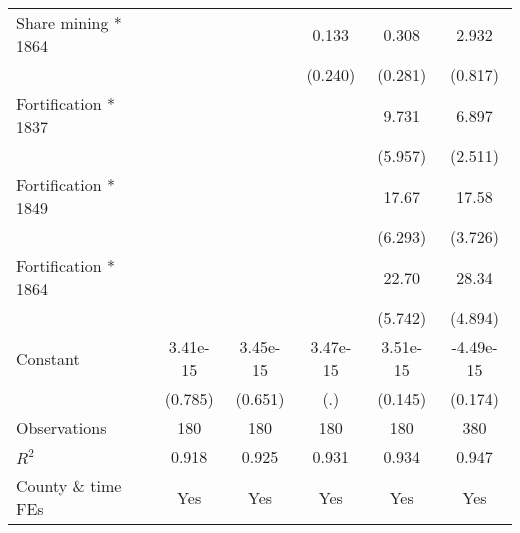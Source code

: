 {\begin{tabular}{l*{5}{c}}
Share mining * 1864 &                     &                     &       0.133         &       0.308         &       2.932\sym{***}\\
                    &                     &                     &     (0.240)         &     (0.281)         &     (0.817)         \\
Fortification * 1837&                     &                     &                     &       9.731         &       6.897\sym{***}\\
                    &                     &                     &                     &     (5.957)         &     (2.511)         \\
Fortification * 1849&                     &                     &                     &       17.67\sym{***}&       17.58\sym{***}\\
                    &                     &                     &                     &     (6.293)         &     (3.726)         \\
Fortification * 1864&                     &                     &                     &       22.70\sym{***}&       28.34\sym{***}\\
                    &                     &                     &                     &     (5.742)         &     (4.894)         \\
Constant            &    3.41e-15         &    3.45e-15         &    3.47e-15         &    3.51e-15         &   -4.49e-15         \\
                    &     (0.785)         &     (0.651)         &         (.)         &     (0.145)         &     (0.174)         \\
\hline
Observations        &         180         &         180         &         180         &         180         &         380         \\
\(R^{2}\)           &       0.918         &       0.925         &       0.931         &       0.934         &       0.947         \\
County \& time FEs  &         Yes         &         Yes         &         Yes         &         Yes         &         Yes         \\
\hline\hline
\end{tabular}
}
